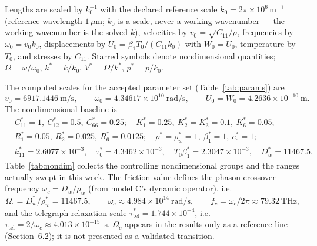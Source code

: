 \documentclass[11pt]{article}
\newcommand{\om}{\omega}
\newcommand{\Om}{\Omega}
\newcommand{\Dw}{D_w}
\newcommand{\rw}{\rho_w}
\begin{document}
Lengths are scaled by $k_0^{-1}$ with the declared reference scale $k_0=2\pi\times10^{6}\,\mathrm{m^{-1}}$ (reference wavelength $1\,\mu$m; $k_0$ is a scale, never a working wavenumber --- the working wavenumber is the solved $k$), velocities by $v_0=\sqrt{C_{11}/\rho}$, frequencies by $\om_0=v_0k_0$, displacements by $U_0=\beta_1T_0/(C_{11}k_0)$ with $W_0=U_0$, temperature by $T_0$, and stresses by $C_{11}$. Starred symbols denote nondimensional quantities; $\Om=\om/\om_0$, $k^*=k/k_0$, $V^*=\Om/k^*$, $p^*=p/k_0$.

The computed scales for the accepted parameter set (Table~\ref{tab:params}) are
\begin{equation}
v_0=6917.1446\ \mathrm{m/s},\qquad \om_0=4.34617\times10^{10}\ \mathrm{rad/s},\qquad U_0=W_0=4.2636\times10^{-10}\ \mathrm{m}. \label{eq:scales}
\end{equation}
The nondimensional baseline is
\begin{align}
&C_{11}^*=1,\ C_{12}^*=0.5,\ C_{66}^*=0.25;\quad K_1^*=0.25,\ K_2^*=K_3^*=0.1,\ K_6^*=0.05; \nonumber\\
&R_1^*=0.05,\ R_2^*=0.025,\ R_6^*=0.0125;\quad \rho^*=\rw^*=1,\ \beta_1^*=1,\ c_e^*=1; \nonumber\\
&k_{11}^*=2.6077\times10^{-3},\quad \tau_0^*=4.3462\times10^{-3},\quad T_0\beta_1^*=2.3047\times10^{-3},\quad D_w^*=11467.5. \label{eq:starred}
\end{align}
Table~\ref{tab:nondim} collects the controlling nondimensional groups and the ranges actually swept in this work. The friction value defines the phason crossover frequency $\om_c=\Dw/\rw$ (from model C's dynamic operator), i.e.
\begin{equation}
\Om_c=D_w^*/\rw^*=11467.5,\qquad \om_c\approx4.984\times10^{14}\ \mathrm{rad/s},\qquad f_c=\om_c/2\pi\approx79.32\ \mathrm{THz}, \label{eq:omegac}
\end{equation}
and the telegraph relaxation scale $\tau_{\mathrm{tel}}^*=1.744\times10^{-4}$, i.e.\ $\tau_{\mathrm{tel}}=2/\om_c\approx4.013\times10^{-15}$~s. $\Om_c$ appears in the results only as a reference line (Section~6.2); it is not presented as a validated transition.
\end{document}
